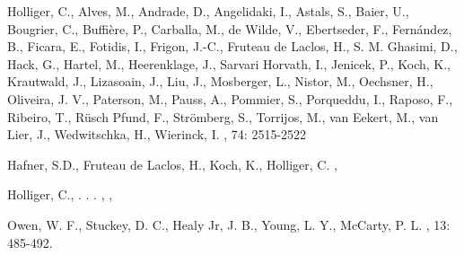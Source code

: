 \documentclass[]{article}
\begin{document}
\begin{thebibliography}{1}

Holliger, C., Alves, M., Andrade, D., Angelidaki, I., Astals, S., Baier, U., Bougrier, C., Buffi{\`e}re, P., Carballa, M., de Wilde, V., Ebertseder, F., Fern{\'a}ndez, B., Ficara, E., Fotidis, I., Frigon, J.-C., Fruteau de Laclos, H., S. M. Ghasimi, D., Hack, G., Hartel, M., Heerenklage, J., Sarvari Horvath, I., Jenicek, P., Koch, K., Krautwald, J., Lizasoain, J., Liu, J., Mosberger, L., Nistor, M., Oechsner, H., Oliveira, J. V., Paterson, M., Pauss, A., Pommier, S., Porqueddu, I., Raposo, F., Ribeiro, T., R{\"u}sch Pfund, F., Str{\"o}mberg, S., Torrijos, M., van Eekert, M., van Lier, J., Wedwitschka, H., Wierinck, I.
,
 74: 2515-2522

  Hafner, S.D., Fruteau de Laclos, H., Koch, K., Holliger, C.
,

Holliger, C., . . .
    ,
    ,


Owen, W. F., Stuckey, D. C., Healy Jr, J. B., Young, L. Y., McCarty, P. L.
,
 13: 485-492.


\end{thebibliography}
\end{document}
